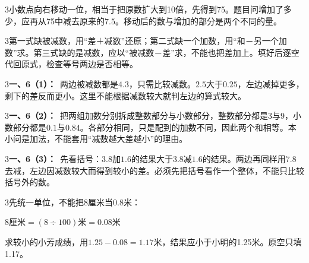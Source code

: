 \documentclass[multi=snippet,border={5bp 20bp 5bp 5bp}]{standalone}
\newenvironment{snippet}[3]{\begin{minipage}{#1bp}\color{answerred}\fontsize{#2}{#3}\selectfont\raggedright}{\end{minipage}}
\begin{document}
\begin{snippet}{505}{11.5}{14}\begin{multicols}{3}\raggedcolumns 小数点向右移动一位，相当于把原数扩大到10倍，先得到75。题目问增加了多少，应再从75中减去原来的\(7.5\)\allowbreak 。移动后的数与增加的部分是两个不同的量。\end{multicols}\end{snippet}
\begin{snippet}{505}{11.5}{14}\begin{multicols}{3}\raggedcolumns 第一式缺被减数，用“差＋减数”还原；第二式缺一个加数，用“和－另一个加数”求。第三式缺的是减数，应以“被减数－差”求，不能也把差加上。填好后逐空代回原式，检查等号两边是否相等。\end{multicols}\end{snippet}
\begin{snippet}{505}{11.5}{14}\begin{multicols}{3}\raggedcolumns \textbf{一、6（1）：}\ 两边被减数都是\(4.3\)\allowbreak ，只需比较减数。\(2.5\)\allowbreak 大于\(0.25\)\allowbreak ，左边减掉更多，剩下的差反而更小。这里不能根据减数较大就判左边的算式较大。\end{multicols}\end{snippet}
\begin{snippet}{505}{11.5}{14}\begin{multicols}{3}\raggedcolumns \textbf{一、6（2）：}\ 把两组加数分别拆成整数部分与小数部分，整数部分都是3与9，小数部分都是\(0.1\)\allowbreak 与\(0.84\)\allowbreak 。各部分相同，只是配到的加数不同，因此两个和相等。本小问是加法，不能套用“减数越大差越小”的理由。\end{multicols}\end{snippet}
\begin{snippet}{505}{11.5}{14}\begin{multicols}{3}\raggedcolumns \textbf{一、6（3）：}\ 先看括号：\(3.8\)\allowbreak 加\(1.6\)\allowbreak 的结果大于\(3.8\)\allowbreak 减\(1.6\)\allowbreak 的结果。两边再同样用\(7.8\)\allowbreak 去减，左边因减数较大而得到较小的差。必须先把括号看作一个整体，不能只比较括号外的数。\end{multicols}\end{snippet}
\begin{snippet}{505}{11.5}{14}\begin{multicols}{3}\raggedcolumns 先统一单位，不能把8厘米当0.8米：\par\noindent\(\displaystyle 8\text{厘米}=(8\div100)\text{米}=0.08\text{米}\)\allowbreak \par 求较小的小芳成绩，用\(1.25-0.08=1.17\)\allowbreak 米，结果应小于小明的1.25米。原空只填1.17。\end{multicols}\end{snippet}
\end{document}
